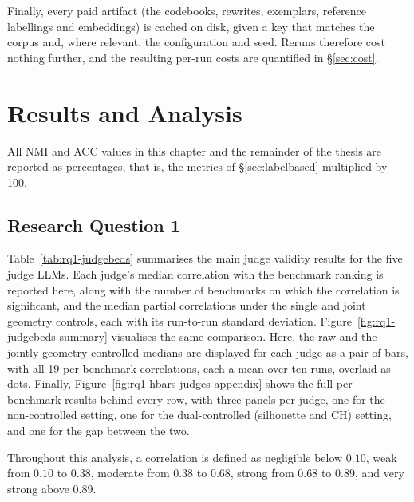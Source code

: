 \documentclass[11pt,a4paper,oneside]{report}
\begin{document}
Finally, every paid artifact (the codebooks, rewrites, exemplars, reference labellings and embeddings) is cached on disk, given a key that matches the corpus and, where relevant, the configuration and seed. Reruns therefore cost nothing further, and the resulting per-run costs are quantified in \S\ref{sec:cost}.





\FloatBarrier
\chapter{Results and Analysis}

All NMI and ACC values in this chapter and the remainder of the thesis are reported as percentages, that is, the metrics of \S\ref{sec:labelbased} multiplied by 100. 

\section{Research Question 1}\label{sec:results-rq1}

Table~\ref{tab:rq1-judgebeds} summarises the main judge validity results for the five judge LLMs. Each judge's median correlation with the benchmark ranking is reported here, along with the number of benchmarks on which the correlation is significant, and the median partial correlations under the single and joint geometry controls, each with its run-to-run standard deviation. Figure~\ref{fig:rq1-judgebeds-summary} visualises the same comparison. Here, the raw and the jointly geometry-controlled medians are displayed for each judge as a pair of bars, with all 19 per-benchmark correlations, each a mean over ten runs, overlaid as dots. Finally, Figure~\ref{fig:rq1-hbars-judges-appendix} shows the full per-benchmark results behind every row, with three panels per judge, one for the non-controlled setting, one for the dual-controlled (silhouette and CH) setting, and one for the gap between the two.

Throughout this analysis, a correlation is defined as negligible below $0.10$, weak from $0.10$ to $0.38$, moderate from $0.38$ to $0.68$, strong from $0.68$ to $0.89$, and very strong above $0.89$.
\end{document}
